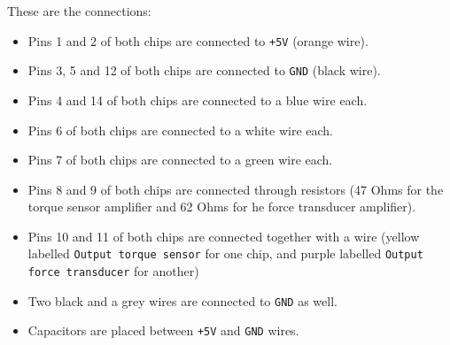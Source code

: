 These are the connections:
\begin{itemize}[noitemsep]
  \item Pins 1 and 2 of both chips are connected to \verb|+5V| (orange wire).
  \item Pins 3, 5 and 12 of both chips are connected to \verb|GND| (black wire).
  \item Pins 4 and 14 of both chips are connected to a blue wire each.
  \item Pins 6 of both chips are connected to a white wire each.
  \item Pins 7 of both chips are connected to a green wire each.
  \item Pins 8 and 9 of both chips are connected through resistors (47 Ohms for the torque sensor amplifier and 62 Ohms for he force transducer amplifier).
  \item Pins 10 and 11 of both chips are connected together with a wire (yellow labelled \verb|Output torque sensor| for one chip, and purple labelled \verb|Output force transducer| for another)
  \item Two black and a grey wires are connected to \verb|GND| as well.
  \item Capacitors are placed between \verb|+5V| and \verb|GND| wires.
\end{itemize}

